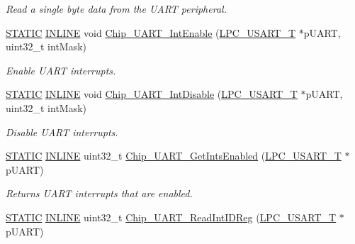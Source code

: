 \begin{DoxyCompactItemize}
\begin{DoxyCompactList}\small\item\em Read a single byte data from the U\+A\+RT peripheral. \end{DoxyCompactList}\item 
\hyperlink{group___l_p_c___types___public___macros_ga10b2d890d871e1489bb02b7e70d9bdfb}{S\+T\+A\+T\+IC} \hyperlink{spifi__18xx__43xx_8h_a2eb6f9e0395b47b8d5e3eeae4fe0c116}{I\+N\+L\+I\+NE} void \hyperlink{group___u_a_r_t__18_x_x__43_x_x_ga5a816f48dc294f330cc2cc7b32f9e88b}{Chip\+\_\+\+U\+A\+R\+T\+\_\+\+Int\+Enable} (\hyperlink{struct_l_p_c___u_s_a_r_t___t}{L\+P\+C\+\_\+\+U\+S\+A\+R\+T\+\_\+T} $\ast$p\+U\+A\+RT, uint32\+\_\+t int\+Mask)
\begin{DoxyCompactList}\small\item\em Enable U\+A\+RT interrupts. \end{DoxyCompactList}\item 
\hyperlink{group___l_p_c___types___public___macros_ga10b2d890d871e1489bb02b7e70d9bdfb}{S\+T\+A\+T\+IC} \hyperlink{spifi__18xx__43xx_8h_a2eb6f9e0395b47b8d5e3eeae4fe0c116}{I\+N\+L\+I\+NE} void \hyperlink{group___u_a_r_t__18_x_x__43_x_x_gaf92136333a1b6efdfd40e96f97d4a24e}{Chip\+\_\+\+U\+A\+R\+T\+\_\+\+Int\+Disable} (\hyperlink{struct_l_p_c___u_s_a_r_t___t}{L\+P\+C\+\_\+\+U\+S\+A\+R\+T\+\_\+T} $\ast$p\+U\+A\+RT, uint32\+\_\+t int\+Mask)
\begin{DoxyCompactList}\small\item\em Disable U\+A\+RT interrupts. \end{DoxyCompactList}\item 
\hyperlink{group___l_p_c___types___public___macros_ga10b2d890d871e1489bb02b7e70d9bdfb}{S\+T\+A\+T\+IC} \hyperlink{spifi__18xx__43xx_8h_a2eb6f9e0395b47b8d5e3eeae4fe0c116}{I\+N\+L\+I\+NE} uint32\+\_\+t \hyperlink{group___u_a_r_t__18_x_x__43_x_x_ga090e960cbbcc79be17bf52a52ec3595c}{Chip\+\_\+\+U\+A\+R\+T\+\_\+\+Get\+Ints\+Enabled} (\hyperlink{struct_l_p_c___u_s_a_r_t___t}{L\+P\+C\+\_\+\+U\+S\+A\+R\+T\+\_\+T} $\ast$p\+U\+A\+RT)
\begin{DoxyCompactList}\small\item\em Returns U\+A\+RT interrupts that are enabled. \end{DoxyCompactList}\item 
\hyperlink{group___l_p_c___types___public___macros_ga10b2d890d871e1489bb02b7e70d9bdfb}{S\+T\+A\+T\+IC} \hyperlink{spifi__18xx__43xx_8h_a2eb6f9e0395b47b8d5e3eeae4fe0c116}{I\+N\+L\+I\+NE} uint32\+\_\+t \hyperlink{group___u_a_r_t__18_x_x__43_x_x_ga6a69343d3d7025055dd2326a8fdd3c74}{Chip\+\_\+\+U\+A\+R\+T\+\_\+\+Read\+Int\+I\+D\+Reg} (\hyperlink{struct_l_p_c___u_s_a_r_t___t}{L\+P\+C\+\_\+\+U\+S\+A\+R\+T\+\_\+T} $\ast$p\+U\+A\+RT)

\end{DoxyCompactItemize}
